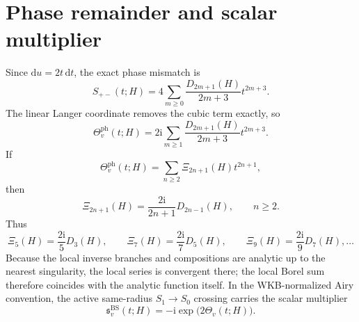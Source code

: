 \documentclass[11pt]{article}
\newcommand{\ii}{\mathrm{i}}
\newcommand{\dd}{\mathrm{d}}
\begin{document}
\section{Phase remainder and scalar multiplier}
Since $\dd u=2t\,\dd t$, the exact phase mismatch is
\begin{equation}
 S_{+-}(t;H)=4\sum_{m\ge0}\frac{D_{2m+1}(H)}{2m+3}t^{2m+3}.
\end{equation}
The linear Langer coordinate removes the cubic term exactly, so
\begin{equation}
 \Theta_v^{\mathrm{ph}}(t;H)=2\ii\sum_{m\ge1}\frac{D_{2m+1}(H)}{2m+3}t^{2m+3}.
\end{equation}
If
\begin{equation}
 \Theta_v^{\mathrm{ph}}(t;H)=\sum_{n\ge2}\Xi_{2n+1}(H)t^{2n+1},
\end{equation}
then
\begin{equation}
 \Xi_{2n+1}(H)=\frac{2\ii}{2n+1}D_{2n-1}(H),\qquad n\ge2.
\end{equation}
Thus
\begin{equation}
 \Xi_5(H)=\frac{2\ii}{5}D_3(H),\qquad \Xi_7(H)=\frac{2\ii}{7}D_5(H),\qquad \Xi_9(H)=\frac{2\ii}{9}D_7(H),\dots
\end{equation}
Because the local inverse branches and compositions are analytic up to the nearest singularity, the local series is convergent there; the local Borel sum therefore coincides with the analytic function itself. In the WKB-normalized Airy convention, the active same-radius $S_1\to S_0$ crossing carries the scalar multiplier
\begin{equation}
 \mathfrak s_v^{\mathrm{BS}}(t;H)=-\ii\exp\!\bigl(2\Theta_v(t;H)\bigr).
\end{equation}
\end{document}
